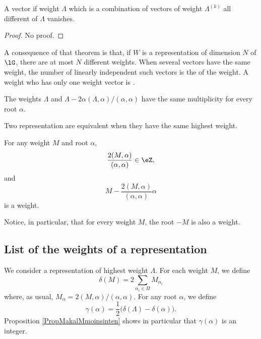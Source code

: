 \begin{theorem}
    A vector if weight $\Lambda$ which is a combination of vectors of weight $\Lambda^{(k)}$ all different of $\Lambda$ vanishes.
\end{theorem}
\begin{proof}
    No proof.
\end{proof}
A consequence of that theorem is that, if $W$ is a representation of dimension $N$ of $\lG$, there are at most $N$ different weights. When several vectors have the same weight, the number of linearly independent such vectors is the  of the weight. A weight who has only one weight vector is .

\begin{proposition}
    The weights $\Lambda$ and $\Lambda-2\alpha(\Lambda,\alpha)/(\alpha,\alpha)$ have the same multiplicity for every root $\alpha$.
\end{proposition}

\begin{theorem}
    Two representation are equivalent when they have the same highest weight.
\end{theorem}

\begin{proposition}     \label{PropMakalMmoinsinten}
For any weight $M$ and root $\alpha$,
\begin{equation}
    \frac{ 2(M,\alpha) }{ (\alpha,\alpha) }\in\eZ,
\end{equation}
and 
\begin{equation}
    M-\frac{ 2(M,\alpha) }{ (\alpha,\alpha) }\alpha
\end{equation}
is a weight.
\end{proposition}
Notice, in particular,  that for every weight $M$, the root $-M$ is also a weight.

                    \subsection{List of the weights of a representation}

We consider a representation of highest weight $\Lambda$. For each weight $M$, we define
\begin{equation}
    \delta(M)=2\sum_{\alpha_i\in\Pi}M_{\alpha_i}
\end{equation}
where, as usual, $M_{\alpha}=2(M,\alpha)/(\alpha,\alpha)$. For any root $\alpha$, we define
\begin{equation}
    \gamma(\alpha)=\frac{ 1 }{2}\big( \delta(\Lambda)-\delta(\alpha) \big).
\end{equation}
Proposition \ref{PropMakalMmoinsinten} shows in particular that $\gamma(\alpha)$ is an integer. 

